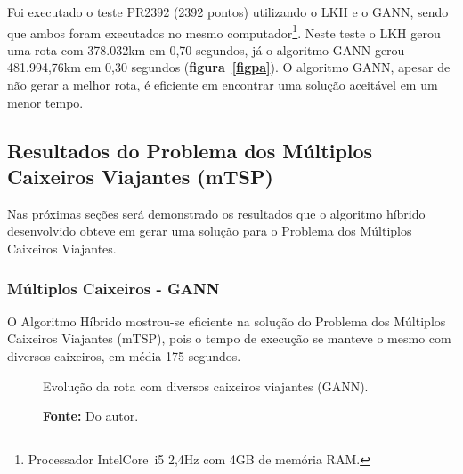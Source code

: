 \documentclass[12pt,openright,a4paper,oneside]{tcc}
\begin{document}
		Foi executado o teste PR2392 (2392 pontos) utilizando o LKH e o GANN, sendo que ambos foram executados no mesmo computador\footnote{Processador Intel\textregistered Core\texttrademark ~i5 2,4Hz com 4GB de memória RAM.}. Neste teste o LKH gerou uma rota com 378.032km em 0,70 segundos, já o algoritmo GANN gerou 481.994,76km em 0,30 segundos (\textbf{figura~\ref{figpa}}).
		O algoritmo GANN, apesar de não gerar a melhor rota, é eficiente em encontrar uma solução aceitável em um menor tempo.

        \newpage
		\subsection{Resultados do Problema dos Múltiplos Caixeiros Viajantes (mTSP)}	

        Nas próximas seções será demonstrado os resultados que o algoritmo híbrido desenvolvido obteve em gerar uma solução para o Problema dos Múltiplos Caixeiros Viajantes.

		\subsubsection{Múltiplos Caixeiros - GANN}
		
		O Algoritmo Híbrido mostrou-se eficiente na solução do Problema dos Múltiplos Caixeiros Viajantes (mTSP), pois o tempo de execução se manteve o mesmo com diversos caixeiros, em média 175 segundos.

		\begin{figure}[h]
			\centering
            \caption{Evolução da rota com diversos caixeiros viajantes (GANN).}
			\caption*{\textbf{Fonte:} Do autor.}
			\label{figmult}
		\end{figure}
\end{document}

